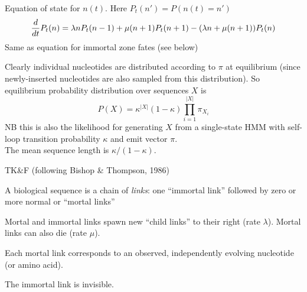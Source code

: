 \documentclass{beamer}
\begin{document}
\begin{frame}{}
\itemb
\item Equation of state for $n(t)$. Here $P_t(n') = P(n(t)=n')$
\[
\frac{d}{d {t}} P_t(n) = \lambda n P_t(n-1) + \mu (n+1) P_t(n+1) - (\lambda n + \mu (n+1)) P_t(n)
\]
Same as equation for immortal zone fates (see below)
\item Clearly individual nucleotides are distributed according to $\pi$ at equilibrium
(since newly-inserted nucleotides are also sampled from this distribution).
So equilibrium probability distribution over sequences $X$ is
\[
P(X) = \kappa^{|X|} (1-\kappa) \prod_{i=1}^{|X|} \pi_{X_i}
\]
NB this is also the likelihood for generating $X$ from a single-state HMM with self-loop transition probability $\kappa$ and emit vector $\pi$.
\\
The mean sequence length is $\kappa/(1-\kappa)$. %
\iteme
\end{frame}

\begin{frame}{}
\itemb
\item TK\&F %
 (following Bishop \& Thompson, 1986)
 \itemb
 \item A biological sequence is a chain of {\em links}: one ``immortal link'' followed by zero or more normal or ``mortal links''
 \item Mortal and immortal links spawn new ``child links'' to their right (rate $\lambda$). Mortal links can also die (rate $\mu$).
 \item Each mortal link corresponds to an observed, independently evolving nucleotide (or amino acid).
 \item The immortal link is invisible.
 \iteme
\iteme
\end{frame}

\begin{frame}{}
\small
{}
\normalsize
\end{frame}
\end{document}
